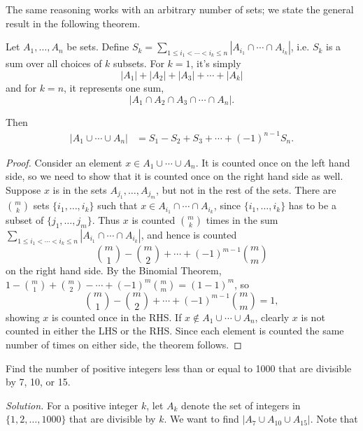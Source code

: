 The same reasoning works with an arbitrary number of sets; we state the general result in the following theorem.
\begin{thm}
 Let $A_1,\ldots, A_n$ be sets. Define $S_k=\sum_{1\le i_1<\cdots < i_k\le n} |A_{i_1}\cap \cdots \cap A_{i_k}|$,  %
i.e. $S_k$ is a sum over all choices of $k$ subsets. For $k=1$, it's simply \[
|A_1|+|A_2|+|A_3|+\cdots+|A_k|
\]  
and for $k=n$, it represents one sum,
\[
|A_{1}\cap A_{2}\cap A_{3}\cap \cdots \cap A_{n}|.
\]  

Then
\begin{align*}
|A_1\cup \cdots \cup A_n|&=S_{1}-S_{2}+S_{3}+\cdots+(-1)^{n-1}S_{n}.
\end{align*}
\end{thm}
\begin{proof}
Consider an element $x\in A_1\cup \cdots \cup A_n$. It is counted once on the left hand side, so we need to show that it is counted once on the right hand side as well. Suppose $x$ is in the sets $A_{j_1},\ldots, A_{j_m}$, but not in the rest of the sets. There are $\binom mk$ sets $\{i_1,\ldots, i_k\}$ such that $x\in A_{i_1}\cap \cdots \cap A_{i_k}$, since $\{i_1,\ldots, i_k\}$ has to be a subset of $\{j_1,\ldots,j_m\}$. Thus $x$ is counted $\binom mk$ times in the sum $\sum_{1\le i_1<\cdots <i_k\le n}|A_{i_1}\cap \cdots \cap A_{i_k}|$, and hence is counted
\[
\binom m1-\binom m2+\cdots +(-1)^{m-1}\binom mm
\]
on the right hand side. By the Binomial Theorem, $1-\binom m1+\binom m2-\cdots +(-1)^{m}\binom mm=(1-1)^m$, so 
\[
\binom m1-\binom m2+\cdots +(-1)^{m-1}\binom mm=1,
\]
showing $x$ is counted once in the RHS. If $x\nin A_1\cup \cdots \cup A_n$, clearly $x$ is not counted in either the LHS or the RHS. Since each element is counted the same number of times on either side, the theorem follows.
\end{proof}
\begin{ex}
Find the number of positive integers less than or equal to 1000 that are divisible by 7, 10, or 15.
\end{ex}
{\it Solution.} For a positive integer $k$, let $A_k$ denote the set of integers in $\{1,2,\ldots, 1000\}$ that are divisible by $k$. We want to find $|A_7\cup A_{10}\cup A_{15}|$. Note that
